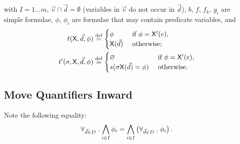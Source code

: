 \documentclass{article}
\begin{document}
with 
$I = 1 \ldots m$, $\vec{v} \cap \vec{d} = \emptyset$ (variables in $\vec{v}$ do not occur in $\vec{d}$), $b$, $f$, $f_k$, $g_i$ are simple formulae, $\phi$, $\phi_i$ are formulae that may contain predicate variables, and
\begin{align*}
t(\mathsf{X},\vec{d},\phi) &\mathrel{\displaystyle \mathop{=}^{\text{def}}}
\begin{cases}
\phi                              
  & \text{ if } \phi = \mathsf{X}'(e), \\
\mathsf{X}(\vec{d})
  & \text{ otherwise; }
\end{cases}\\
t'(\sigma,\mathsf{X},\vec{d},\phi) &\mathrel{\displaystyle \mathop{=}^{\text{def}}}
\begin{cases}
\varnothing
  & \text{ if } \phi = \mathsf{X}'(e), \\
s( \sigma \mathsf{X}(\vec{d}) = \phi )  
  & \text{ otherwise. }
\end{cases}
\end{align*}




\subsection{Move Quantifiers Inward}

Note the following equality:
\[
  \forall_{\vec{d} \in D} \mathrel{.} \bigwedge_{i \in I} \phi_i
  = \bigwedge_{i \in I} \left( \forall_{\vec{d} \in D} \mathrel{.} \phi_i \right).
\]
\end{document}
